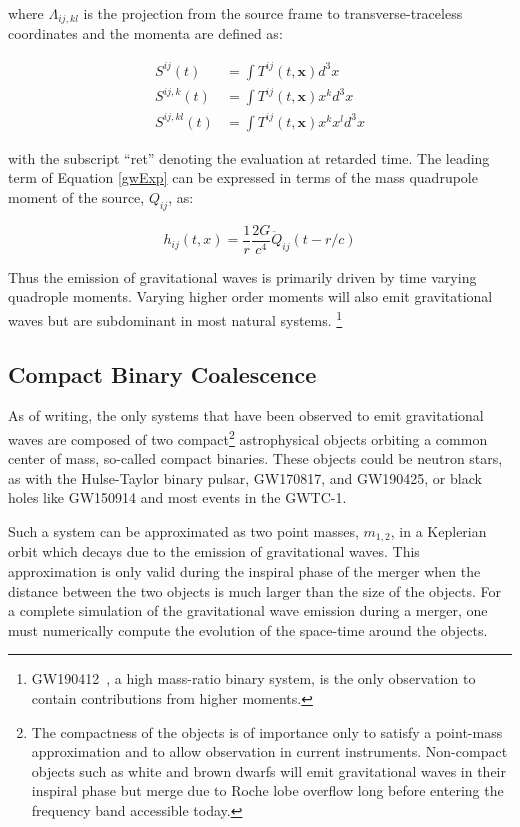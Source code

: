 \documentclass [12pt, proquest]{uwthesis}[2019]
\begin{document}
where $\Lambda_{ij,kl}$ is the projection from the source frame to transverse-traceless coordinates and the momenta are defined as:

\begin{align}
S^{ij}(t)&=\int T^{ij}(t,\mathbf{x}) d^3x\\
S^{ij,k}(t)&=\int T^{ij}(t,\mathbf{x}) x^k d^3x\\
S^{ij,kl}(t)&=\int T^{ij}(t,\mathbf{x}) x^k x^l d^3x
\end{align}

with the subscript ``ret'' denoting the evaluation at retarded time. The leading term of Equation \ref{gwExp} can be expressed in terms of the mass quadrupole moment of the source, $Q_{ij}$, as:

\begin{equation}
h_{ij}(t,x)=\frac{1}{r}\frac{2 G}{c^4} \ddot{Q}_{ij}(t-r/c)
\end{equation}

Thus the emission of gravitational waves is primarily driven by time varying quadrople moments. Varying higher order moments will also emit gravitational waves but are subdominant in most natural systems. \footnote{GW190412~\cite{GW190412}, a high mass-ratio binary system, is the only observation to contain contributions from higher moments.}

\subsection{Compact Binary Coalescence}\label{CBC}

As of writing, the only systems that have been observed to emit gravitational waves are composed of two compact\footnote{The compactness of the objects is of importance only to satisfy a point-mass approximation and to allow observation in current instruments. Non-compact objects such as white and brown dwarfs will emit gravitational waves in their inspiral phase but merge due to Roche lobe overflow long before entering the frequency band accessible today.} astrophysical objects orbiting a common center of mass, so-called compact binaries. These objects could be neutron stars, as with the Hulse-Taylor binary pulsar\cite{hulseTaylor}, GW170817\cite{GW170817}, and GW190425\cite{GW190425}, or black holes like GW150914\cite{GW150914} and most events in the GWTC-1\cite{GWTC}.

Such a system can be approximated as two point masses, $m_{1,2}$, in a Keplerian orbit which decays due to the emission of gravitational waves. This approximation is only valid during the inspiral phase of the merger when the distance between the two objects is much larger than the size of the objects. For a complete simulation of the gravitational wave emission during a merger, one must numerically compute the evolution of the space-time around the objects.~\cite{NGR}
\end{document}
